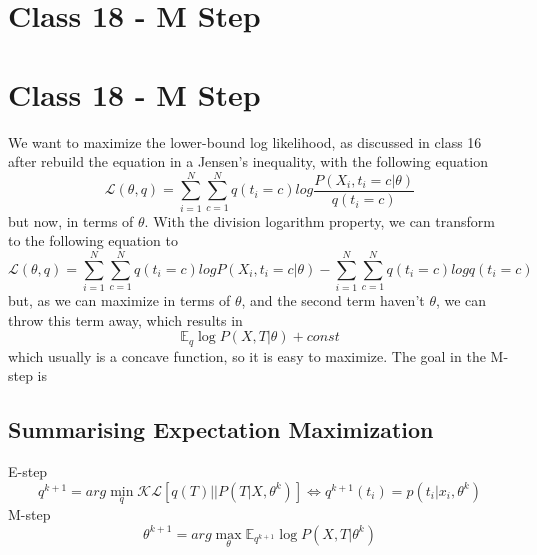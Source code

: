 \documentclass{article}
\begin{document}
\section{Class 18 - M Step}

\section{Class 18 - M Step}
We want to maximize the lower-bound log likelihood, as discussed in class 16 after rebuild the equation in a Jensen's inequality, with the following equation
\begin{equation}
    \mathcal{L}(\theta, q) = \sum_{i=1}^N \sum_{c=1}^N q(t_i = c) log \frac{P(X_i, t_i = c|\theta)}{q(t_i = c)}
\end{equation}
but now, in terms of $\theta$. With the division logarithm property, we can transform to the following equation to
\begin{equation}
    \mathcal{L}(\theta, q) = \sum_{i=1}^N \sum_{c=1}^N q(t_i = c) log P(X_i, t_i = c|\theta) - \sum_{i=1}^N \sum_{c=1}^N q(t_i = c) log q(t_i = c)
\end{equation}
but, as we can maximize in terms of $\theta$, and the second term haven't $\theta$, we can throw this term away, which results in
\begin{equation}
    \mathbb{E}_q \log P(X, T|\theta) + const
\end{equation}
which usually is a concave function, so it is easy to maximize. The goal in the M-step is

\subsection{Summarising Expectation Maximization}
E-step
\begin{equation}
    q^{k+1} = arg \min_q \mathcal{KL}[q(T) || P(T|X, \theta^k)] \Leftrightarrow q^{k+1}(t_i) = p(t_i|x_i, \theta^k)
\end{equation}
M-step
\begin{equation}
    \theta^{k+1} = arg \max_\theta \mathbb{E}_{q^{k+1}} \log P(X, T|\theta^k)
\end{equation}
\end{document}
